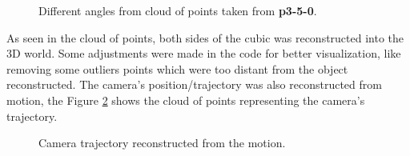 \documentclass[12pt,a4paper]{article}
\begin{document}
\begin{figure}[!h]
	\caption{Different angles from cloud of points taken from \textbf{p3-5-0}.}
	\label{fig:3dpoints}
\end{figure}

As seen in the cloud of points, both sides of the cubic was reconstructed into the 3D world. Some adjustments were made in the code for better visualization, like removing some outliers points which were too distant from the object reconstructed. The camera's position/trajectory was also reconstructed from motion, the Figure \ref{fig:3dcamera} shows the cloud of points representing the camera's trajectory.

\begin{figure}[!h]
	\centering
	{
		\setlength{\fboxsep}{1pt}
		\setlength{\fboxrule}{1pt}
	}
	\caption{Camera trajectory reconstructed from the motion.}
	\label{fig:3dcamera}
\end{figure}
\end{document}
